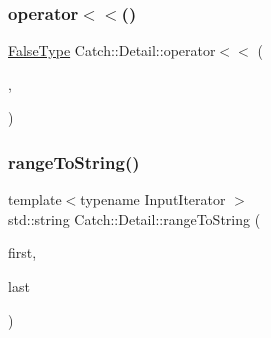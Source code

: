 \subsubsection{\texorpdfstring{operator$<$$<$()}{operator<<()}}
{\footnotesize\ttfamily \hyperlink{struct_catch_1_1_detail_1_1_false_type}{False\+Type} Catch\+::\+Detail\+::operator$<$$<$ (\begin{DoxyParamCaption}\item[{std\+::ostream const \&}]{,  }\item[{\hyperlink{struct_catch_1_1_detail_1_1_borg_type}{Borg\+Type} const \&}]{ }\end{DoxyParamCaption})}

\hypertarget{namespace_catch_1_1_detail_a6650a1dff325bf29962ff15ae73fd972}{}\label{namespace_catch_1_1_detail_a6650a1dff325bf29962ff15ae73fd972} 
\subsubsection{\texorpdfstring{range\+To\+String()}{rangeToString()}}
{\footnotesize\ttfamily template$<$typename Input\+Iterator $>$ \\
std\+::string Catch\+::\+Detail\+::range\+To\+String (\begin{DoxyParamCaption}\item[{Input\+Iterator}]{first,  }\item[{Input\+Iterator}]{last }\end{DoxyParamCaption})}

